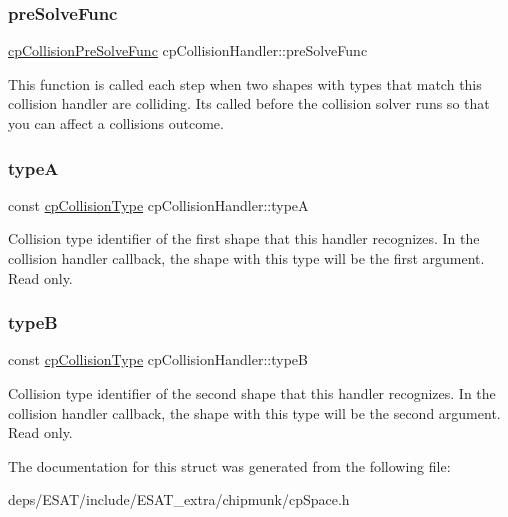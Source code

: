\subsubsection{\texorpdfstring{pre\+Solve\+Func}{preSolveFunc}}
{\footnotesize\ttfamily \mbox{\hyperlink{group__cp_space_ga89b24d53d81a5a028198c3c2d3c39a9d}{cp\+Collision\+Pre\+Solve\+Func}} cp\+Collision\+Handler\+::pre\+Solve\+Func}

This function is called each step when two shapes with types that match this collision handler are colliding. It\textquotesingle{}s called before the collision solver runs so that you can affect a collision\textquotesingle{}s outcome. \mbox{\label{structcp_collision_handler_a07bbc9d26af9d41cc87bae6514930d9f}} 
\subsubsection{\texorpdfstring{typeA}{typeA}}
{\footnotesize\ttfamily const \mbox{\hyperlink{group__basic_types_gae83e2f50965eb441e36ffff1e32e6d02}{cp\+Collision\+Type}} cp\+Collision\+Handler\+::typeA}

Collision type identifier of the first shape that this handler recognizes. In the collision handler callback, the shape with this type will be the first argument. Read only. \mbox{\label{structcp_collision_handler_a7f9def10b179d18de37bec5b3c6d8621}} 
\subsubsection{\texorpdfstring{typeB}{typeB}}
{\footnotesize\ttfamily const \mbox{\hyperlink{group__basic_types_gae83e2f50965eb441e36ffff1e32e6d02}{cp\+Collision\+Type}} cp\+Collision\+Handler\+::typeB}

Collision type identifier of the second shape that this handler recognizes. In the collision handler callback, the shape with this type will be the second argument. Read only. 

The documentation for this struct was generated from the following file\+:\begin{DoxyCompactItemize}
\item 
deps/\+E\+S\+A\+T/include/\+E\+S\+A\+T\+\_\+extra/chipmunk/cp\+Space.\+h\end{DoxyCompactItemize}
